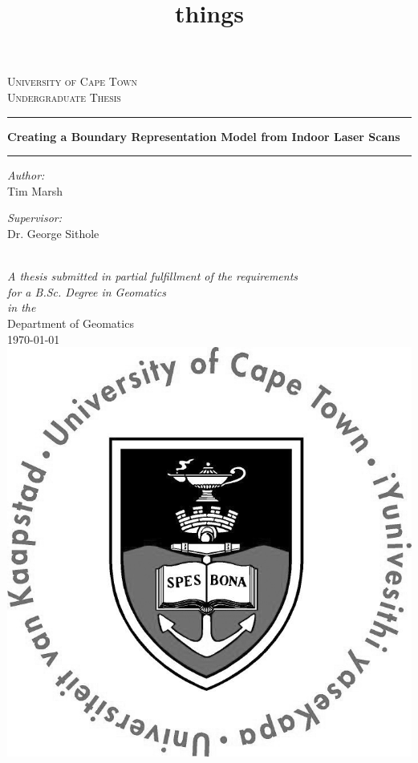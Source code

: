 

\begin{center}
	
	\textsc{\LARGE University of Cape Town}\\[1cm]
	\textsc{\Large Undergraduate Thesis}\\[0.5cm]
	
	\hrule
	\vspace{0.4cm}
	\title{things}
	{\huge \bfseries Creating a Boundary Representation Model from Indoor Laser Scans }\\[0.4cm]
	\hrule
	\vspace{1cm}
	
	\begin{minipage}{0.4\textwidth}
		\begin{flushleft} \large
			\emph{Author:}\\
			\textnormal{Tim Marsh}
		\end{flushleft}
	\end{minipage}
	\begin{minipage}{0.4\textwidth}
		\begin{flushright} \large
			\emph{Supervisor:} \\
			\textnormal{Dr. George Sithole}
		\end{flushright}
	\end{minipage}\\[1cm]
	
	\large \textit{A thesis submitted in partial fulfillment of the requirements\\ for a B.Sc. Degree in Geomatics}\\[0.3cm]
	\textit{in the}\\[0.4cm]
	Department of Geomatics\\[1cm]
	
	{\large \today}\\[0.7cm]
	\includegraphics[scale=0.75]{Includes/images/UCTcircular_logo1_CMYK}
	
	\vfill
\end{center}

